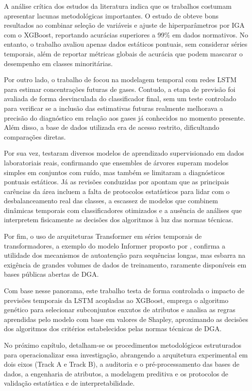 A análise crítica dos estudos da literatura indica que os trabalhos costumam apresentar lacunas metodológicas importantes. O estudo de  obteve bons resultados ao combinar seleção de variáveis e ajuste de hiperparâmetros por IGA com o XGBoost, reportando acurácias superiores a 99\% em dados normativos. No entanto, o trabalho avaliou apenas dados estáticos pontuais, sem considerar séries temporais, além de reportar métricas globais de acurácia que podem mascarar o desempenho em classes minoritárias.

Por outro lado, o trabalho de  focou na modelagem temporal com redes LSTM para estimar concentrações futuras de gases. Contudo, a etapa de previsão foi avaliada de forma desvinculada do classificador final, sem um teste controlado para verificar se a inclusão das estimativas futuras realmente melhorava a precisão do diagnóstico em relação aos gases já conhecidos no momento presente. Além disso, a base de dados utilizada era de acesso restrito, dificultando comparações diretas.

Por sua vez,  testaram diversos modelos de aprendizado supervisionado em dados laboratoriais reais, confirmando que ensembles de árvores superam modelos simples em conjuntos com ruído, mas também se limitaram a diagnósticos pontuais estáticos. Já as revisões conduzidas por  apontam que as principais carências da área incluem a falta de protocolos estatísticos para lidar com o desbalanceamento real das classes, a escassez de modelos que combinem dinâmicas temporais com classificadores otimizados e a ausência de análises que interpretem fisicamente as decisões dos algoritmos à luz das normas técnicas.

Por fim, o uso de arquiteturas Transformer em séries temporais de transformadores, a exemplo do modelo Informer proposto por , confirma a utilidade dos mecanismos de autoatenção para sequências longas, mas esbarra na exigência de grandes volumes de dados de treinamento, raramente disponíveis em bases públicas abertas de DGA.

Com base nesse panorama, este trabalho testa de forma controlada o impacto de previsões temporais da LSTM acopladas ao XGBoost, emprega o algoritmo genético para selecionar subconjuntos enxutos de atributos e analisa as regras aprendidas pelo modelo com base em valores de Shapley, aproximando as decisões dos algoritmos dos critérios estabelecidos pelas normas técnicas de DGA.

No próximo capítulo, detalham-se os procedimentos metodológicos estruturados para operacionalizar essa investigação, abrangendo a arquitetura experimental em dois eixos (Track A e Track B), a auditoria e o pré-processamento das bases de dados, a engenharia de atributos, a modelagem preditiva e os protocolos de validação estatística e de interpretabilidade.